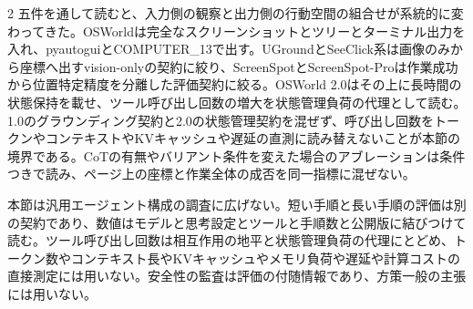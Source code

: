 \documentclass[lualatex,a4paper,10pt]{jlreq}
\begin{document}
\begin{multicols}{2}
\noindent 五件を通して読むと、入力側の観察と出力側の行動空間の組合せが系統的に変わってきた。OSWorldは完全なスクリーンショットとツリーとターミナル出力を入れ、pyautoguiとCOMPUTER\_13で出す。UGroundとSeeClick系は画像のみから座標へ出すvision-onlyの契約に絞り、ScreenSpotとScreenSpot-Proは作業成功から位置特定精度を分離した評価契約に絞る。OSWorld 2.0はその上に長時間の状態保持を載せ、ツール呼び出し回数の増大を状態管理負荷の代理として読む。1.0のグラウンディング契約と2.0の状態管理契約を混ぜず、呼び出し回数をトークンやコンテキストやKVキャッシュや遅延の直測に読み替えないことが本節の境界である。CoTの有無やバリアント条件を変えた場合のアブレーションは条件つきで読み、ページ上の座標と作業全体の成否を同一指標に混ぜない。\autocite{vmd090,vmd091,vmd092,vmd119,vmd120}\par\medskip
\end{multicols}
\begin{claimboundary}[本節の読解上の境界]
\noindent 本節は汎用エージェント構成の調査に広げない。短い手順と長い手順の評価は別の契約であり、数値はモデルと思考設定とツールと手順数と公開版に結びつけて読む。ツール呼び出し回数は相互作用の地平と状態管理負荷の代理にとどめ、トークン数やコンテキスト長やKVキャッシュやメモリ負荷や遅延や計算コストの直接測定には用いない。安全性の監査は評価の付随情報であり、方策一般の主張には用いない。\autocite{vmd090,vmd091,vmd092,vmd119,vmd120}\par
\end{claimboundary}

\Needspace{0.20\textheight}
\end{document}
